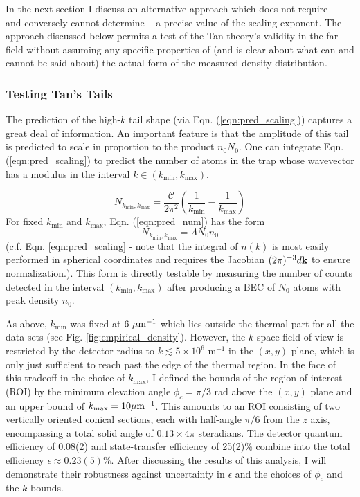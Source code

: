 	In the next section I discuss an alternative approach which does not require -- and conversely cannot determine -- a precise value of the scaling exponent. 
	The approach discussed below permits a test of the Tan theory's validity in the far-field without assuming any specific properties of (and is clear about what can and cannot be said about) the actual form of the measured density distribution.
	
\subsubsection{Testing Tan's Tails}
\label{sec:regression}


	The prediction of the high-$k$ tail shape (via Eqn. (\ref{eqn:pred_scaling})) captures a great deal of information. 
	An important feature is that the amplitude of this tail is predicted to scale in proportion to the product $n_0 N_0$.
	One can integrate Eqn. (\ref{eqn:pred_scaling}) to predict the number of atoms in the trap whose wavevector has a modulus in the interval $k\in (k_\textrm{min}, k_\textrm{max})$. 

	\begin{equation}
		N_{k_\textrm{min},k_\textrm{max}} =\frac{\mathcal{C}}{2\pi^2}\left(\frac{1}{k_\textrm{min}}-\frac{1}{k_\textrm{max}}\right)
		\label{eqn:pred_num}
	\end{equation}
	For fixed $k_\textrm{min}$ and $k_\textrm{max}$, Eqn. (\ref{eqn:pred_num}) has the form {
	\begin{equation}
	N_{k_\textrm{min},k_\textrm{max}} = \Lambda N_0n_0
			\label{eqn:Lambda}
	\end{equation}
	}%
	(c.f. Eqn. \ref{eqn:pred_scaling} - note that the integral of $n(k)$ is most easily performed in spherical coordinates and requires the Jacobian $(2\pi)^{-3}d \textbf{k}$ to ensure normalization.). 
	This form is directly testable by measuring the number of counts detected in the interval $(k_\textrm{min},k_\textrm{max})$ after producing a BEC of $N_0$ atoms with peak density $n_0$. 
	
	As above, $k_\textrm{min}$ was fixed at $6~\mu\textrm{m}^{-1}$ which lies outside the thermal part for all the data sets (see Fig. \ref{fig:empirical_density}).
	However, the $k$-space field of view is restricted by the detector radius to $k\lesssim5\times 10^6$ m$^{-1}$ in the $(x,y)$ plane, which is only just sufficient to reach past the edge of the thermal region. 
	In the face of this tradeoff in the choice of $k_\textrm{max}$, I defined the bounds of the region of interest (ROI) by the minimum elevation angle $\phi_c=\pi/3$ rad above the $(x,y)$ plane and an upper bound of $k_\textrm{max} = 10\mu\textrm{m}^{-1}$.
	This amounts to an ROI consisting of two vertically oriented conical sections, each with half-angle $\pi/6$ from the $z$ axis, encompassing a total solid angle of $0.13\times 4\pi$ steradians. 
	The detector quantum efficiency of 0.08(2) and state-transfer efficiency of 25(2)\% combine  into the total efficiency $\epsilon\approx0.23(5)\%$.
	After discussing the results of this analysis, I will demonstrate their robustness against uncertainty in $\epsilon$ and the choices of $\phi_c$ and the $k$ bounds.

